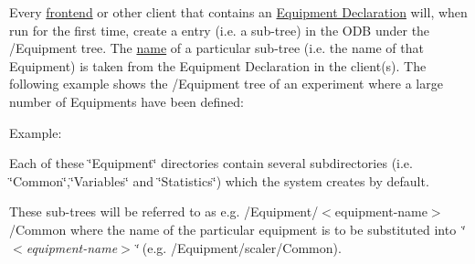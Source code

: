 \par


Every \hyperlink{FrontendOperation_FE_Intro}{frontend} or other client that contains an \hyperlink{FE_eqdec}{Equipment Declaration} will, when run for the first time, create a entry (i.e. a sub-\/tree) in the ODB under the /Equipment tree. The \hyperlink{FE_table_FE_tbl_EqName}{name} of a particular sub-\/tree (i.e. the name of that Equipment) is taken from the Equipment Declaration in the client(s). The following example shows the /Equipment tree of an experiment where a large number of Equipments have been defined:

Example: 


Each of these \char`\"{}Equipment\char`\"{} directories contain several subdirectories (i.e. \char`\"{}Common\char`\"{},\char`\"{}Variables\char`\"{} and \char`\"{}Statistics\char`\"{}) which the system creates by default.

These sub-\/trees will be referred to as e.g. /Equipment/$<$equipment-\/name$>$/Common where the name of the particular equipment is to be substituted into {\itshape \char`\"{}$<$equipment-\/name$>$\char`\"{}\/} (e.g. /Equipment/scaler/Common).

